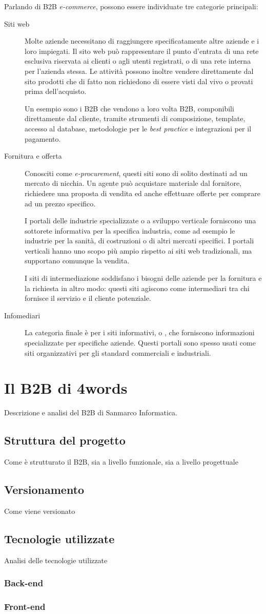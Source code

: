Parlando di B2B \textit{e-commerce}, possono essere individuate tre categorie principali:
\begin{description}
	\item[Siti web] Molte aziende necessitano di raggiungere specificatamente altre aziende e i loro impiegati. Il sito web può rappresentare il punto d'entrata di una rete esclusiva riservata ai clienti o agli utenti registrati, o di una rete interna per l'azienda stessa. Le attività possono inoltre vendere direttamente dal sito prodotti che di fatto non richiedono di essere visti dal vivo o provati prima dell'acquisto.
	
	Un esempio sono i B2B che vendono a loro volta B2B, componibili direttamente dal cliente, tramite strumenti di composizione, template, accesso al database, metodologie per le \textit{best practice} e integrazioni per il pagamento.
	
	\item[Fornitura e offerta] Conosciti come \textit{e-procurement}, questi siti sono di solito destinati ad un mercato di nicchia. Un agente può acquistare materiale dal fornitore, richiedere una proposta di vendita ed anche effettuare offerte per comprare ad un prezzo specifico.
	
	I portali delle industrie specializzate o a sviluppo verticale forniscono una sottorete informativa per la specifica industria, come ad esempio le industrie per la sanità, di costruzioni o di altri mercati specifici.
	I portali verticali hanno uno scopo più ampio rispetto ai siti web tradizionali, ma supportano comunque la vendita.
	
	I siti di intermediazione soddisfano i bisogni delle aziende per la fornitura e la richiesta in altro modo: questi siti agiscono come intermediari tra chi fornisce il servizio e il cliente potenziale.
	
	\item[Infomediari] La categoria finale è per i siti informativi, o , che forniscono informazioni specializzate per specifiche aziende. Questi portali sono spesso usati come siti organizzativi per gli standard commerciali e industriali.
\end{description}
\section{Il B2B di 4words}
Descrizione e analisi del B2B di Sanmarco Informatica.
\subsection{Struttura del progetto}
Come è strutturato il B2B, sia a livello funzionale, sia a livello progettuale
\subsection{Versionamento}
Come viene versionato
\subsection{Tecnologie utilizzate}
Analisi delle tecnologie utilizzate
\subsubsection{Back-end}
\subsubsection{Front-end}